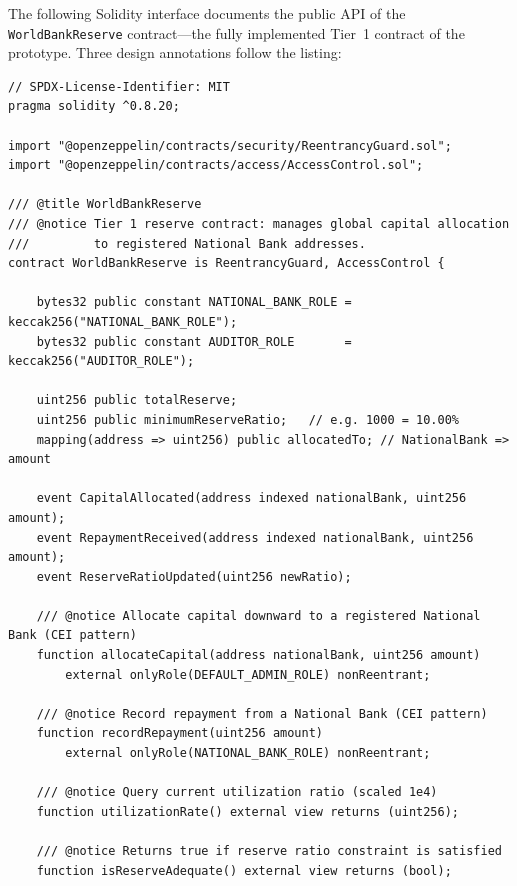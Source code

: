 \documentclass[12pt,a4paper]{report}
\begin{document}
The following Solidity interface documents the public API of the \texttt{WorldBankReserve} contract---the fully implemented Tier~1 contract of the prototype. Three design annotations follow the listing:

\begin{lstlisting}[language=Solidity,basicstyle=\ttfamily\scriptsize,breaklines=true,
    commentstyle=\color{GrayText},keywordstyle=\color{PrimaryBlue}\bfseries,
    frame=single,rulecolor=\color{AccentBlue!40},captionpos=b,
    caption={WorldBankReserve.sol -- Tier 1 public interface. Full implementation in project repository.}]
// SPDX-License-Identifier: MIT
pragma solidity ^0.8.20;

import "@openzeppelin/contracts/security/ReentrancyGuard.sol";
import "@openzeppelin/contracts/access/AccessControl.sol";

/// @title WorldBankReserve
/// @notice Tier 1 reserve contract: manages global capital allocation
///         to registered National Bank addresses.
contract WorldBankReserve is ReentrancyGuard, AccessControl {

    bytes32 public constant NATIONAL_BANK_ROLE = keccak256("NATIONAL_BANK_ROLE");
    bytes32 public constant AUDITOR_ROLE       = keccak256("AUDITOR_ROLE");

    uint256 public totalReserve;
    uint256 public minimumReserveRatio;   // e.g. 1000 = 10.00%
    mapping(address => uint256) public allocatedTo; // NationalBank => amount

    event CapitalAllocated(address indexed nationalBank, uint256 amount);
    event RepaymentReceived(address indexed nationalBank, uint256 amount);
    event ReserveRatioUpdated(uint256 newRatio);

    /// @notice Allocate capital downward to a registered National Bank (CEI pattern)
    function allocateCapital(address nationalBank, uint256 amount)
        external onlyRole(DEFAULT_ADMIN_ROLE) nonReentrant;

    /// @notice Record repayment from a National Bank (CEI pattern)
    function recordRepayment(uint256 amount)
        external onlyRole(NATIONAL_BANK_ROLE) nonReentrant;

    /// @notice Query current utilization ratio (scaled 1e4)
    function utilizationRate() external view returns (uint256);

    /// @notice Returns true if reserve ratio constraint is satisfied
    function isReserveAdequate() external view returns (bool);


\end{lstlisting}
\end{document}
